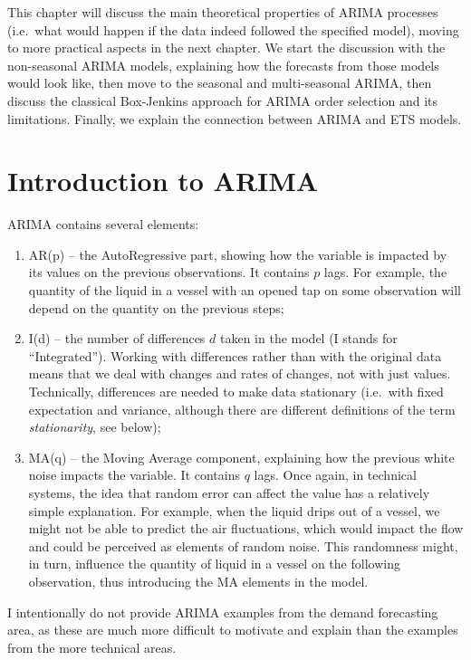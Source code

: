 \documentclass[]{book}
\providecommand{\tightlist}{%
  \setlength{\itemsep}{0pt}\setlength{\parskip}{0pt}}
\theoremstyle{definition}
\theoremstyle{definition}
\theoremstyle{definition}
\theoremstyle{definition}
\theoremstyle{remark}
\begin{document}
This chapter will discuss the main theoretical properties of ARIMA processes (i.e.~what would happen if the data indeed followed the specified model), moving to more practical aspects in the next chapter. We start the discussion with the non-seasonal ARIMA models, explaining how the forecasts from those models would look like, then move to the seasonal and multi-seasonal ARIMA, then discuss the classical Box-Jenkins approach for ARIMA order selection and its limitations. Finally, we explain the connection between ARIMA and ETS models.

\hypertarget{ARIMAIntro}{%
\section{Introduction to ARIMA}\label{ARIMAIntro}}

ARIMA contains several elements:

\begin{enumerate}
\def\labelenumi{\arabic{enumi}.}
\tightlist
\item
  AR(p) -- the AutoRegressive part, showing how the variable is impacted by its values on the previous observations. It contains \(p\) lags. For example, the quantity of the liquid in a vessel with an opened tap on some observation will depend on the quantity on the previous steps;
\item
  I(d) -- the number of differences \(d\) taken in the model (I stands for ``Integrated''). Working with differences rather than with the original data means that we deal with changes and rates of changes, not with just values. Technically, differences are needed to make data stationary (i.e.~with fixed expectation and variance, although there are different definitions of the term \emph{stationarity}, see below);
\item
  MA(q) -- the Moving Average component, explaining how the previous white noise impacts the variable. It contains \(q\) lags. Once again, in technical systems, the idea that random error can affect the value has a relatively simple explanation. For example, when the liquid drips out of a vessel, we might not be able to predict the air fluctuations, which would impact the flow and could be perceived as elements of random noise. This randomness might, in turn, influence the quantity of liquid in a vessel on the following observation, thus introducing the MA elements in the model.
\end{enumerate}

I intentionally do not provide ARIMA examples from the demand forecasting area, as these are much more difficult to motivate and explain than the examples from the more technical areas.
\end{document}
